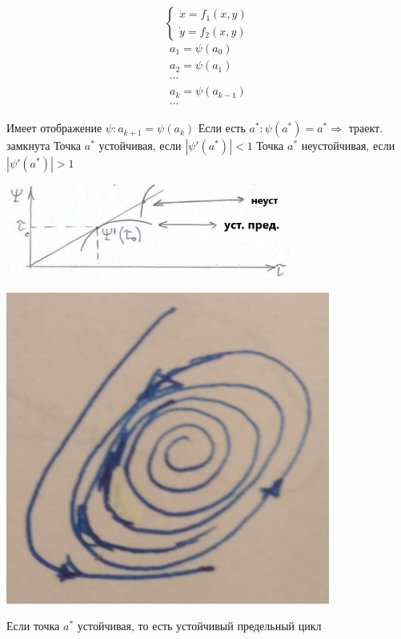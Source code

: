  	\newpage
	\begin{minipage}{0.1\textwidth} 
		$$
			\begin{cases}
	 			\dot{x} = f_1(x,y) \\
	 			\dot{y} = f_2(x,y)
			\end{cases} 
		$$
		$$
			\begin{gathered}
				a_1 = \psi(a_0) \\
				a_2 = \psi(a_1)  \\ \cdots \\
				a_k =\psi(a_{k-1}) 	\\ \cdots		
			\end{gathered}
		$$
	\end{minipage}
		\hfill
	\begin{minipage}{0.5\textwidth}
		\cntrKul Имеет отображение $\psi: a_{k+1} = \psi(a_k)$ \cntrKul \newline
		\cntrKul Если есть $a^*: \psi(a^*)=a^* \Rightarrow$ траект. замкнута \cntrKul \newline 
		\cntrKul Точка $a^*$ устойчивая, если $|\psi'(a^*)|<1$	\cntrKul \newline 
		\cntrKul Точка $a^*$ неустойчивая, если $|\psi'(a^*)|> 1$ \cntrKul
		\begin{center} \includegraphics[width=0.7\textwidth]{ch8/pict/pict_3_2.png} \end{center} 
	\end{minipage}
	\begin{minipage}{0.31\textwidth}
		\begin{center} \includegraphics[width=0.8\textwidth]{ch8/pict/pict_3_1.png} \end{center} 
		\cntrKul Если точка $a^*$ устойчивая, \cntrKul \newline
		\cntrKul то есть устойчивый  \cntrKul \newline
		 \cntrKul предельный цикл  \cntrKul
	\end{minipage}		
	
